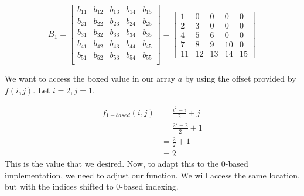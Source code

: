 \documentclass[12pt,letterpaper,final]{report}
\begin{document}
\begin{enumerate}
        \[
          B_1 =
          \begin{bmatrix}
            b_{11}         & b_{12} & b_{13} & b_{14} & b_{15} \\
            \boxed{b_{21}} & b_{22} & b_{23} & b_{24} & b_{25} \\
            b_{31}         & b_{32} & b_{33} & b_{34} & b_{35} \\
            b_{41}         & b_{42} & b_{43} & b_{44} & b_{45} \\
            b_{51}         & b_{52} & b_{53} & b_{54} & b_{55} \\
          \end{bmatrix}
          =
          \begin{bmatrix}
            1         & 0  & 0  & 0  & 0  \\
            \boxed{2} & 3  & 0  & 0  & 0  \\
            4         & 5  & 6  & 0  & 0  \\
            7         & 8  & 9  & 10 & 0  \\
            11        & 12 & 13 & 14 & 15
          \end{bmatrix}
        \]

        We want to access the boxed value in our array $a$ by using the offset provided by $f(i,j)$. Let $i=2,j=1$.

        \begin{align*}
          f_{1-based}(i,j) & = \frac{i^2 - i}{2} + j \\
                           & = \frac{2^2 - 2}{2} + 1 \\
                           & = \frac{2}{2} + 1       \\
                           & = 2
        \end{align*}
        This is the value that we desired. Now, to adapt this to the 0-based implementation, we need to adjust our function. We will access the same location, but with the indices shifted to 0-based indexing.


\end{enumerate}
\end{document}
